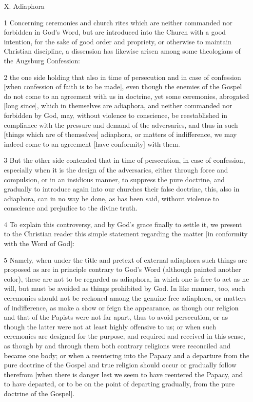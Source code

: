 {X. Adiaphora

1 Concerning ceremonies and church rites which are neither commanded nor forbidden in God’s Word, but are introduced into the Church with a good intention, for the sake of good order and propriety, or otherwise to maintain Christian discipline, a dissension has likewise arisen among some theologians of the Augsburg Confession:

2 the one side holding that also in time of persecution and in case of confession [when confession of faith is to be made], even though the enemies of the Gospel do not come to an agreement with us in doctrine, yet some ceremonies, abrogated [long since], which in themselves are adiaphora, and neither commanded nor forbidden by God, may, without violence to conscience, be reestablished in compliance with the pressure and demand of the adversaries, and thus in such [things which are of themselves] adiaphora, or matters of indifference, we may indeed come to an agreement [have conformity] with them.

3 But the other side contended that in time of persecution, in case of confession, especially when it is the design of the adversaries, either through force and compulsion, or in an insidious manner, to suppress the pure doctrine, and gradually to introduce again into our churches their false doctrine, this, also in adiaphora, can in no way be done, as has been said, without violence to conscience and prejudice to the divine truth.

4 To explain this controversy, and by God’s grace finally to settle it, we present to the Christian reader this simple statement regarding the matter [in conformity with the Word of God]:

5 Namely, when under the title and pretext of external adiaphora such things are proposed as are in principle contrary to God’s Word (although painted another color), these are not to be regarded as adiaphora, in which one is free to act as he will, but must be avoided as things prohibited by God. In like manner, too, such ceremonies should not be reckoned among the genuine free adiaphora, or matters of indifference, as make a show or feign the appearance, as though our religion and that of the Papists were not far apart, thus to avoid persecution, or as though the latter were not at least highly offensive to us; or when such ceremonies are designed for the purpose, and required and received in this sense, as though by and through them both contrary religions were reconciled and became one body; or when a reentering into the Papacy and a departure from the pure doctrine of the Gospel and true religion should occur or gradually follow therefrom [when there is danger lest we seem to have reentered the Papacy, and to have departed, or to be on the point of departing gradually, from the pure doctrine of the Gospel].

}
